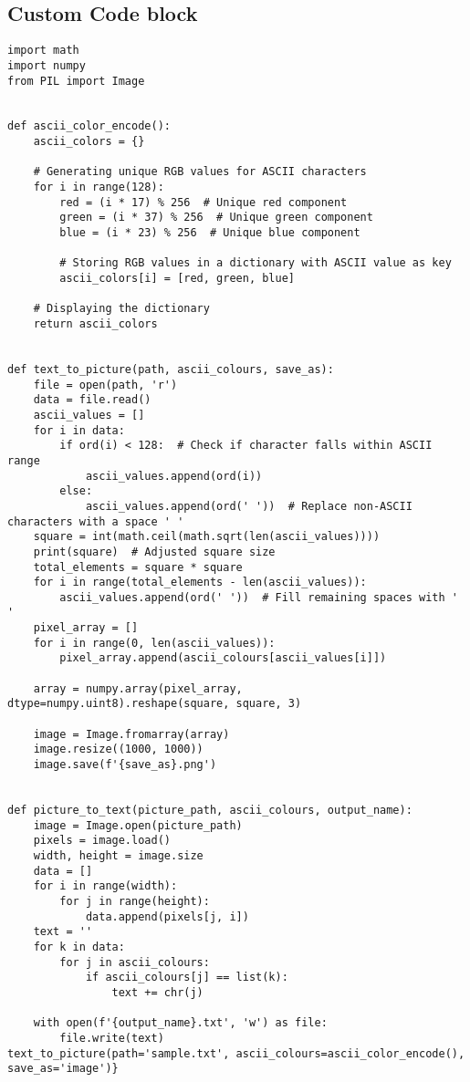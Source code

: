 \documentclass[openany]{book}
\begin{document}
\subsection{Custom Code block}
\begin{longlisting}
\begin{verbatim}
import math
import numpy
from PIL import Image


def ascii_color_encode():
    ascii_colors = {}

    # Generating unique RGB values for ASCII characters
    for i in range(128):
        red = (i * 17) % 256  # Unique red component
        green = (i * 37) % 256  # Unique green component
        blue = (i * 23) % 256  # Unique blue component

        # Storing RGB values in a dictionary with ASCII value as key
        ascii_colors[i] = [red, green, blue]

    # Displaying the dictionary
    return ascii_colors


def text_to_picture(path, ascii_colours, save_as):
    file = open(path, 'r')
    data = file.read()
    ascii_values = []
    for i in data:
        if ord(i) < 128:  # Check if character falls within ASCII range
            ascii_values.append(ord(i))
        else:
            ascii_values.append(ord(' '))  # Replace non-ASCII characters with a space ' '
    square = int(math.ceil(math.sqrt(len(ascii_values))))
    print(square)  # Adjusted square size
    total_elements = square * square
    for i in range(total_elements - len(ascii_values)):
        ascii_values.append(ord(' '))  # Fill remaining spaces with ' '
    pixel_array = []
    for i in range(0, len(ascii_values)):
        pixel_array.append(ascii_colours[ascii_values[i]])

    array = numpy.array(pixel_array, dtype=numpy.uint8).reshape(square, square, 3)

    image = Image.fromarray(array)
    image.resize((1000, 1000))
    image.save(f'{save_as}.png')


def picture_to_text(picture_path, ascii_colours, output_name):
    image = Image.open(picture_path)
    pixels = image.load()
    width, height = image.size
    data = []
    for i in range(width):
        for j in range(height):
            data.append(pixels[j, i])
    text = ''
    for k in data:
        for j in ascii_colours:
            if ascii_colours[j] == list(k):
                text += chr(j)

    with open(f'{output_name}.txt', 'w') as file:
        file.write(text)
text_to_picture(path='sample.txt', ascii_colours=ascii_color_encode(), save_as='image')}
\end{verbatim}
\end{longlisting}
\end{document}
